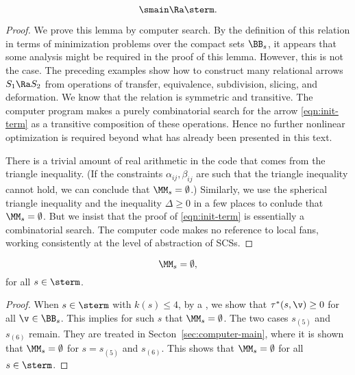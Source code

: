 \begin{lemma}\label{lemma:init-term}
\begin{equation}\label{eqn:init-term}
\smain\Ra \sterm.
\end{equation}
\end{lemma}

\begin{proof}
We prove this lemma by computer search.
   By the definition of this
relation in terms of minimization problems over the compact sets
$\BB_s$,
it appears that some analysis might be required in the proof
of this lemma.  However, this is not the case.  The
preceding
examples show how to construct many relational arrows $S_1\Ra S_2$
from operations of transfer, equivalence, subdivision, slicing, and deformation.
We know that the relation is symmetric and transitive.   The computer
program makes a purely combinatorial search for the arrow
\eqref{eqn:init-term}
as a transitive composition of these operations.  
Hence no further nonlinear optimization is required
beyond
what has already been presented in this text.

There is a trivial amount of real arithmetic in the code that comes
from the triangle inequality.   (If
the constraints $\alpha_{ij},\beta_{ij}$ are such that the triangle
inequality cannot hold, we can conclude that $\MM_s=\emptyset$.)
Similarly, we use the spherical triangle inequality and the inequality
$\Delta\ge0$ in a few places to conlude that $\MM_s=\emptyset$.
But we insist that the proof of \eqref{eqn:init-term} is essentially
a combinatorial search.  The computer code makes no reference
to local fans, working consistently at the level of abstraction of SCSs.
\end{proof}

\begin{lemma}\label{lemma:sterm-empty}
\[
\MM_s=\emptyset,
\]
for all $s\in\sterm$.
\end{lemma}

\begin{proof}
When $s\in \sterm$
with $k(s)\le 4$, by a , we show
that $\tau^*(s,\v) \ge0$ for all $\v\in \BB_s$.  This implies for such $s$
that $\MM_s=\emptyset$.  The two cases $s_{(5)}$ and $s_{(6)}$ remain.
They are treated in Secton~\ref{sec:computer-main}, where it is shown
that $\MM_s=\emptyset$ for $ s=s_{(5)}$ and $s_{(6)}$.  This
shows that $\MM_s=\emptyset$ for all $s\in \sterm$.
\end{proof}

